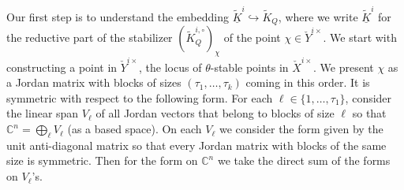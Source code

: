 \documentclass[12pt]{amsart}
\newcommand{\C}{\mathbb{C}}
\theoremstyle{definition}
\numberwithin{equation}{section}
\begin{document}
Our first step is to understand the embedding $\underline{\tilde{K}}^i\hookrightarrow \tilde{K}_Q$, where we write
$\underline{\tilde{K}}^i$ for the  reductive part of the stabilizer $(\tilde{K}^{i,\circ}_Q)_\chi$ of the point $\chi \in \check{Y}^{i\times}$.  %
We start with constructing a point in $\check{Y}^{i\times}$, the locus of $\theta$-stable points in
$\check{X}^{i\times}$. We present $\chi$
as a Jordan matrix with blocks of sizes $(\tau_1,\ldots,\tau_k)$ coming in this order.
It is symmetric with respect to the following form. For each
$\ell\in \{1,\ldots,\tau_1\}$, consider the linear span $V_\ell$
of all Jordan vectors that belong to blocks of size $\ell$
so that $\C^n=\bigoplus_\ell V_\ell$ (as a based
space). On each
$V_\ell$ we consider the form given by the unit anti-diagonal matrix
so that every Jordan matrix with blocks of the same size is symmetric. Then
for the form on $\C^n$ we take the direct sum of the forms on $V_\ell$'s.
\end{document}
